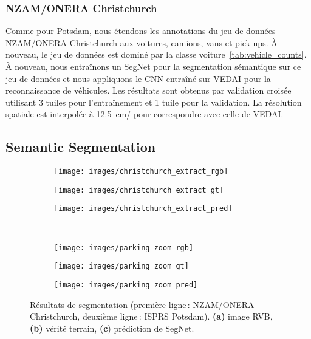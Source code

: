 \subsubsection{NZAM/ONERA Christchurch}

Comme pour Potsdam, nous étendons les annotations du jeu de données NZAM/ONERA Christchurch aux voitures, camions, vans et pick-ups. À nouveau, le jeu de données est dominé par la classe voiture~\cref{tab:vehicle_counts}. À nouveau, nous entraînons un SegNet pour la segmentation sémantique sur ce jeu de données et nous appliquons le \gls{CNN} entraîné sur \gls{VEDAI} pour la reconnaissance de véhicules. Les résultats sont obtenus par validation croisée utilisant 3 tuiles pour l'entraînement et 1 tuile pour la validation. La résolution spatiale est interpolée à \SI{12,5}{\centi\meter/\px} pour correspondre avec celle de \gls{VEDAI}.

\subsection{Semantic Segmentation\label{sec:semantic_seg}}
\begin{figure}[t]
	\centering
	\begin{subfigure}{0.3\textwidth}
    	\texttt{[image: images/christchurch\_extract\_rgb]}
    \end{subfigure}
    \begin{subfigure}{0.3\textwidth}
    	\texttt{[image: images/christchurch\_extract\_gt]}
    \end{subfigure}
    \begin{subfigure}{0.3\textwidth}
    	\texttt{[image: images/christchurch\_extract\_pred]}
    \end{subfigure}\\
    	\begin{subfigure}{0.3\textwidth}
    	\texttt{[image: images/parking\_zoom\_rgb]}
        \caption{}
    \end{subfigure}
    \begin{subfigure}{0.3\textwidth}
    	\texttt{[image: images/parking\_zoom\_gt]}
        \caption{}
    \end{subfigure}
    \begin{subfigure}{0.3\textwidth}
    	\texttt{[image: images/parking\_zoom\_pred]}
        \caption{}
    \end{subfigure}\vspace{-12pt}

    \caption{Résultats de segmentation (première ligne\,: NZAM/ONERA Christchurch, deuxième ligne\,: ISPRS Potsdam). \textbf{(a)} image \gls{RVB}, \textbf{(b)} vérité terrain, \textbf{(c}) prédiction de SegNet.\\\isprslegende}
    \label{fig:segmentations}
\end{figure}
